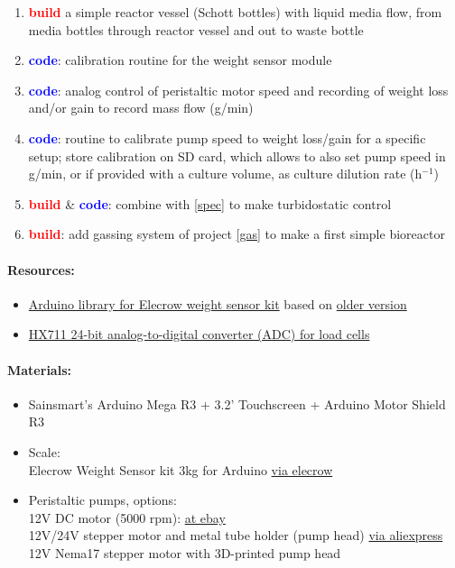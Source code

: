 \documentclass[12pt,a4paper]{scrartcl}
\newcommand{\build}[0]{\textcolor{red}{\textbf{build}}}
\newcommand{\code}[0]{\textcolor{blue}{\textbf{code}}}
\newcommand{\ph}[0]{h{\small$^{-1}$}}
\begin{document}
\begin{enumerate}
\item \build{} a simple reactor vessel (Schott bottles) with liquid
  media flow, from media bottles through reactor vessel and out to
  waste bottle 
\item \code{}: calibration routine for the weight sensor module
\item \code{}: analog control of peristaltic motor speed and recording of
  weight loss and/or gain to record mass flow (g/min)
\item \code{}: routine to calibrate pump speed to weight loss/gain
  for a specific setup; store calibration on SD card, which allows
  to also set pump speed in g/min, or if provided with a culture
  volume, as culture dilution rate (\ph{})
\item \build{} \& \code{}: combine with \ref{spec} to make
  turbidostatic control
\item \build{}: add gassing system of project \ref{gas} to make a first
  simple bioreactor
\end{enumerate}

\paragraph{Resources:}
\begin{itemize}
\item \href{ https://github.com/bogde/HX711}{Arduino library for Elecrow weight sensor kit} based on \href{https://github.com/aguegu/ardulibs/tree/master/hx711}{older version}
\item \href{https://cdn.sparkfun.com/datasheets/Sensors/ForceFlex/hx711_english.pdf}{HX711 24-bit analog-to-digital converter (ADC) for load cells}
\end{itemize}

\paragraph{Materials:}
\begin{itemize}
\item Sainsmart's Arduino Mega R3 + 3.2' Touchscreen + Arduino Motor Shield R3
\item Scale:\\ Elecrow Weight Sensor kit 3kg for Arduino
  \href{http://www.elecrow.com/weight-sensor-kit-3kg-p-883.html}{via
    elecrow}
\item Peristaltic pumps, options:\\
  12V DC motor (5000 rpm): \href{http://www.ebay.de/itm/2stk-12V-Schlauchpumpe-Dosierpumpe-Peristaltikpumpe-Wasser-Pumpe-Silikonschlauch-/191363832760}{at ebay}\\
  12V/24V stepper motor and metal tube holder (pump head) \href{http://de.aliexpress.com/item/Peristaltic-Pump-with-step-motor-precision-peristaltic-pump-peristaltic-filling/2013487841.html}{via aliexpress}\\
  12V Nema17 stepper motor with 3D-printed pump head
\end{itemize}
\end{document}
